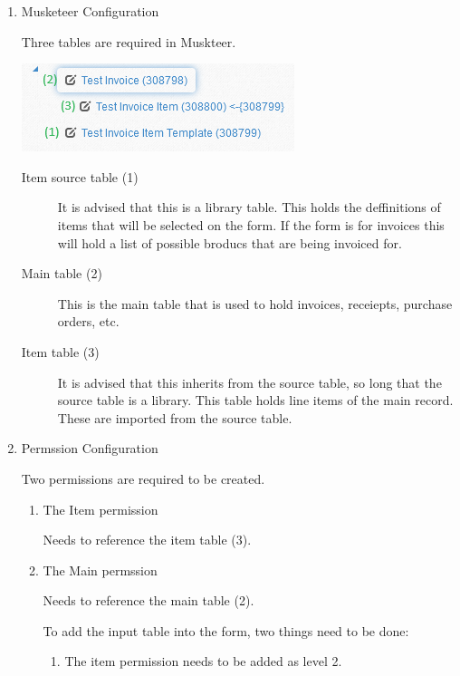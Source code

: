 \documentclass[11pt]{article}
\begin{document}
\begin{enumerate}
\item Musketeer Configuration
\label{sec:org42dc098}

Three tables are required in Muskteer.

\begin{center}
\includegraphics[width=.9\linewidth]{./invoice-basic-setup-fll.png}
\end{center}

\begin{description}
\item[{Item source table (1)}] It is advised that this is a library table.
This holds the deffinitions of items that will be selected on the form.
If the form is for invoices this will hold a list of possible broducs that are being invoiced for.

\item[{Main table (2)}] This is the main table that is used to hold invoices, receiepts, purchase orders, etc.

\item[{Item table (3)}] It is advised that this inherits from the source table, so long that the source table is a library.
This table holds line items of the main record.
These are imported from the source table.
\end{description}
\item Permssion Configuration
\label{sec:org97492df}

Two permissions are required to be created.
\begin{enumerate}
\item The Item permission
\label{sec:org703f1c8}

Needs to reference the item table (3).
\item The Main permssion
\label{sec:org0730f64}

Needs to reference the main table (2).

To add the input table into the form, two things need to be done:

\begin{enumerate}
\item The item permission needs to be added as level 2.


\end{enumerate}
\end{enumerate}
\end{enumerate}
\end{document}

